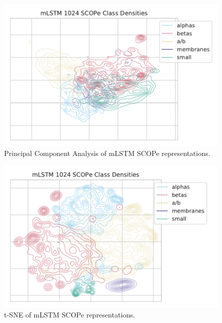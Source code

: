 \documentclass[a4paper,12pt]{article}
\begin{document}
\begin{minipage}{\linewidth}
\begin{minipage}{\linewidth}
\begin{minipage}{0.48\linewidth}
\begin{figure}[H]
			\label{fig:GRU_tSNE_compare}
		\end{figure}
	\end{minipage}
\end{minipage}
	\vfill
	\vspace{1cm}
\begin{minipage}{\linewidth}
	\centering
	\begin{minipage}{0.48\linewidth}
		\begin{figure}[H]
			\includegraphics[width=\linewidth]{figures/fig2c_mLSTM_1024_no_trunc_PCA.pdf}
			\caption{Principal Component Analysis of mLSTM SCOPe representations.}
			\label{fig:mLSTM_pca_compare}
		\end{figure}
	\end{minipage}
	\hfill
	\begin{minipage}{0.48\linewidth}
		\begin{figure}[H]
			\includegraphics[width=\linewidth]{figures/fig2c_mLSTM_1024_no_trunc.pdf}
			\caption{t-SNE of mLSTM SCOPe representations.}
			\label{fig:mLSTM_tSNE_compare}
		\end{figure}
	\end{minipage}
\end{minipage}
\end{minipage}
\end{document}
